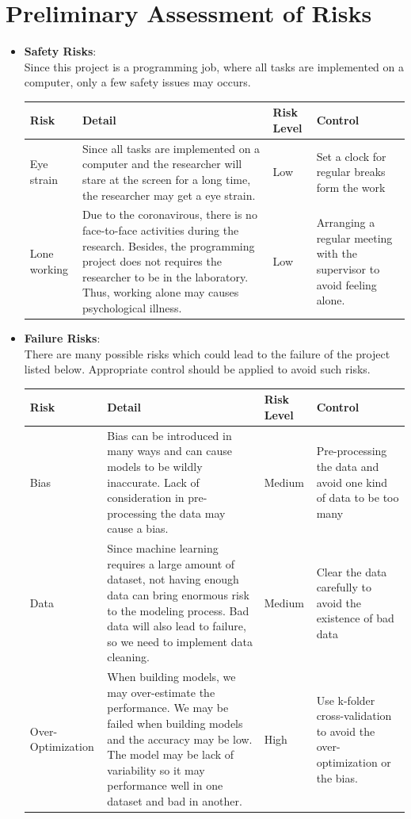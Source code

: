 \documentclass[ a4paper, 12pt, oneside ]{article} %
\begin{document}
\section{Preliminary Assessment of Risks} 
\label{sec:RiskAssessment}
\begin{itemize}
\item{\textbf{Safety Risks}:\\
Since this project is a programming job, where all tasks are implemented on a computer, only a few safety issues may occurs.\\}
\begin{tabular}{p{2.2cm}p{5cm}p{1.2cm}p{2cm}}
\hline  
Risk&Detail&Risk Level&Control\\
\hline 
Eye strain&Since all tasks are implemented on a computer and the researcher will stare at the screen for a long time, the researcher may get a eye strain.&Low&Set a clock for regular breaks form the work\\
\hline
Lone working&Due to the coronavirous, there is no face-to-face activities during the research. Besides, the programming project does not requires the researcher to be in the laboratory. Thus, working alone may causes psychological illness.&Low&Arranging a regular meeting with the supervisor to avoid feeling alone.\\
\hline
\end{tabular}
\newpage
\item{\textbf{Failure Risks}: \\
There are many possible risks which could lead to the failure of the project listed below. Appropriate control should be applied to avoid such risks.\\
\begin{tabular}{p{2.2cm}p{5cm}p{1.2cm}p{2cm}}
\hline  
Risk&Detail&Risk Level&Control\\
\hline 
Bias&Bias can be introduced in many ways and can cause models to be wildly inaccurate. Lack of consideration in pre-processing the data may cause a bias.&Medium&Pre-processing the data and avoid one kind of data to be too many\\
\hline
Data&Since machine learning requires a large amount of dataset, not having enough data can bring enormous risk to the modeling process. Bad data will also lead to failure, so we need to implement data cleaning.&Medium&Clear the data carefully to avoid the existence of bad data\\
\hline 
Over-Optimization&When building models, we may over-estimate the performance. We may be failed when building models and the accuracy may be low. The model may be lack of variability so it may performance well in one dataset and bad in another.&High&Use k-folder cross-validation to avoid the over-optimization or the bias.\\

\end{tabular}}
\end{itemize}
\end{document}
